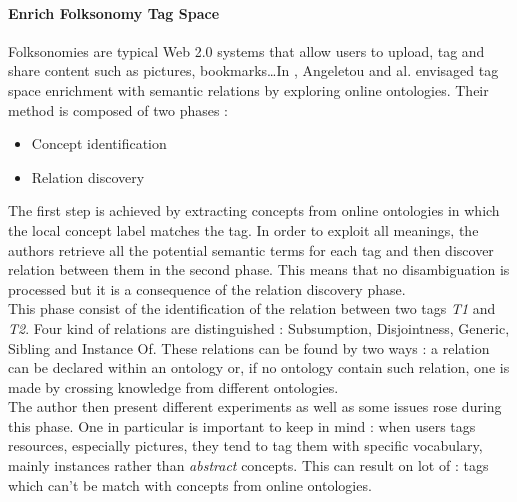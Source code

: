 \paragraph{Enrich Folksonomy Tag Space} %
\label{par:enrich_folksonomy_tag_space}
Folksonomies are typical Web 2.0 systems that allow users to upload, tag and share content such as pictures, bookmarks\dots In \cite{angel}, Angeletou and al. envisaged tag space enrichment with semantic relations by exploring online ontologies. Their method is composed of two phases :
\begin{itemize}
	\item Concept identification 
	\item Relation discovery
\end{itemize}
The first step is achieved by extracting concepts from online ontologies in which the local concept label matches the tag. In order to exploit all meanings, the authors retrieve all the potential semantic terms for each tag and then discover relation between them in the second phase. This means that no disambiguation is processed but it is a consequence of the relation discovery phase.\\
This phase consist of the identification of the relation between two tags \emph{T1} and \emph{T2}. Four kind of relations are distinguished : Subsumption, Disjointness, Generic, Sibling and Instance Of. These relations can be found by two ways : a relation can be declared within an ontology or, if no ontology contain such relation, one is made by crossing knowledge from different ontologies.\\
The author then present different experiments as well as some issues rose during this phase. One in particular is important to keep in mind : when users tags resources, especially pictures, they tend to tag them with specific vocabulary, mainly instances rather than \emph{abstract} concepts. This can result on lot of  : tags which can't be match with concepts from online ontologies.

